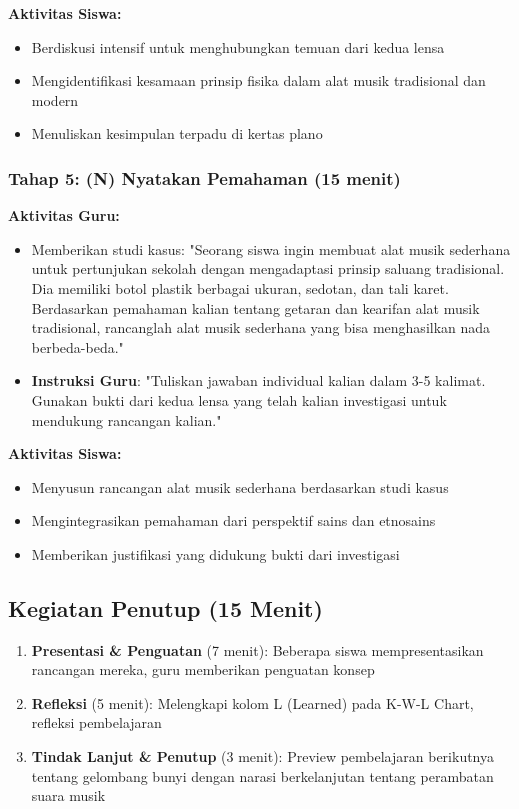 \documentclass[12pt,a4paper]{article}
\begin{document}
\textbf{Aktivitas Siswa:}
\begin{itemize}
\item Berdiskusi intensif untuk menghubungkan temuan dari kedua lensa
\item Mengidentifikasi kesamaan prinsip fisika dalam alat musik tradisional dan modern
\item Menuliskan kesimpulan terpadu di kertas plano
\end{itemize}

\subsubsection{Tahap 5: (N) Nyatakan Pemahaman (15 menit)}

\textbf{Aktivitas Guru:}
\begin{itemize}
\item Memberikan studi kasus: "Seorang siswa ingin membuat alat musik sederhana untuk pertunjukan sekolah dengan mengadaptasi prinsip saluang tradisional. Dia memiliki botol plastik berbagai ukuran, sedotan, dan tali karet. Berdasarkan pemahaman kalian tentang getaran dan kearifan alat musik tradisional, rancanglah alat musik sederhana yang bisa menghasilkan nada berbeda-beda."
\item \textbf{Instruksi Guru}: "Tuliskan jawaban individual kalian dalam 3-5 kalimat. Gunakan bukti dari kedua lensa yang telah kalian investigasi untuk mendukung rancangan kalian."
\end{itemize}

\textbf{Aktivitas Siswa:}
\begin{itemize}
\item Menyusun rancangan alat musik sederhana berdasarkan studi kasus
\item Mengintegrasikan pemahaman dari perspektif sains dan etnosains
\item Memberikan justifikasi yang didukung bukti dari investigasi
\end{itemize}

\subsection{Kegiatan Penutup (15 Menit)}

\begin{enumerate}
\item \textbf{Presentasi \& Penguatan} (7 menit): Beberapa siswa mempresentasikan rancangan mereka, guru memberikan penguatan konsep
\item \textbf{Refleksi} (5 menit): Melengkapi kolom L (Learned) pada K-W-L Chart, refleksi pembelajaran
\item \textbf{Tindak Lanjut \& Penutup} (3 menit): Preview pembelajaran berikutnya tentang gelombang bunyi dengan narasi berkelanjutan tentang perambatan suara musik
\end{enumerate}
\end{document}

